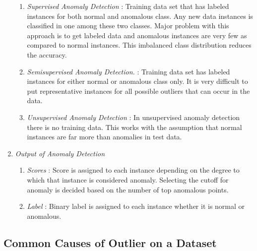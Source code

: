 \begin{enumerate}
	\begin{enumerate}
		
		\item \textit{Supervised Anomaly Detection} : Training data set that has labeled instances for both normal and anomalous class. Any new data instances is classified in one among these two classes. Major problem with this approach is to get labeled data and anomalous instances are very few as compared to normal instances. This imbalanced class distribution reduces the accuracy. 
		
		\item \textit{Semisupervised Anomaly Detection.} : Training data set has labeled instances for either normal or anomalous class only. It is very difficult to put representative instances for all possible outliers that can occur in the data.
		
		\item \textit{Unsupervised Anomaly Detection} : In unsupervised anomaly detection there is no training data. This works with the assumption that normal instances are far more than anomalies in test data.   
	\end{enumerate}
	
	
	\item \textit{Output of Anomaly Detection}
	
	\begin{enumerate}
		\item \textit{Scores} : Score is assigned to each instance depending on the degree to which that instance is considered anomaly. Selecting the cutoff for anomaly is decided based on the number of top anomalous points.
		
		\item \textit{Label} : Binary label is assigned to each instance whether it is normal or anomalous.
	\end{enumerate} 
	
	
\end{enumerate}

\subsection{Common Causes of Outlier on a Dataset}





